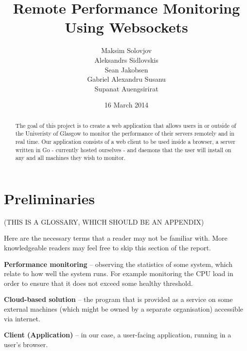 \documentclass{l3proj}
\begin{document}
\title{Remote Performance Monitoring Using Websockets}
\author{Maksim Solovjov \\
        Aleksandrs Sidlovskis \\
        Sean Jakobsen \\
        Gabriel Alexandru Susanu \\
        Supanat Auengsirirat}
\date{16 March 2014}
\maketitle
\begin{abstract}

The goal of this project is to create a web application that allows users in or outside of the Univeristy of Glasgow to monitor the performance of their servers remotely and in real time. Our application consists of a web client to be used inside a browser, a server written in Go - currently hosted ourselves - and daemons that the user will install on any and all machines they wish to monitor.

\end{abstract}
\educationalconsent
\tableofcontents



\chapter{Preliminaries}
\label{prelim}

(THIS IS A GLOSSARY, WHICH SHOULD BE AN APPENDIX)

Here are the necessary terms that a reader may not be familiar with. More knowledgeable readers may feel free to skip this section of the report.

\textbf{Performance monitoring} – observing the statistics of some system, which relate to how well the system runs. For example monitoring the CPU load in order to ensure that it does not exceed some healthy threshold.

\textbf{Cloud-based solution} – the program that is provided as a service on some external machines (which might be owned by a separate organisation) accessible via internet.

\textbf{Client (Application)} – in our case, a user-facing application, running in a user’s browser.
\end{document}
